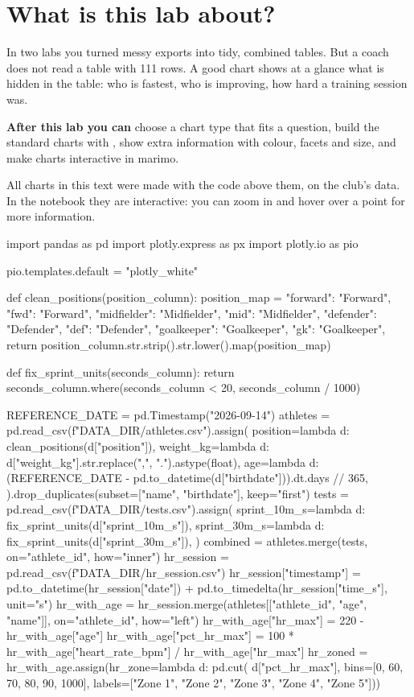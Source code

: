 \documentclass[11pt,a4paper]{article}
\author{dr. Maarten Slembrouck}
\begin{document}

\section*{What is this lab about?}

In two labs you turned messy exports into tidy, combined tables. But a
coach does not read a table with 111 rows. A good chart shows at a
glance what is hidden in the table: who is fastest, who is improving,
how hard a training session was.

\textbf{After this lab you can} choose a chart type that fits a
question, build the standard charts with , show
extra information with colour, facets and size, and make charts
interactive in marimo.

All charts in this text were made with the code above them, on the
club's data. In the notebook they are interactive: you can zoom in and
hover over a point for more information.

\begin{python}[hide]
import pandas as pd
import plotly.express as px
import plotly.io as pio

pio.templates.default = "plotly_white"

def clean_positions(position_column):
    position_map = {
        "forward": "Forward", "fwd": "Forward",
        "midfielder": "Midfielder", "mid": "Midfielder",
        "defender": "Defender", "def": "Defender",
        "goalkeeper": "Goalkeeper", "gk": "Goalkeeper",
    }
    return position_column.str.strip().str.lower().map(position_map)

def fix_sprint_units(seconds_column):
    return seconds_column.where(seconds_column < 20, seconds_column / 1000)

REFERENCE_DATE = pd.Timestamp("2026-09-14")
athletes = pd.read_csv(f"{DATA_DIR}/athletes.csv").assign(
    position=lambda d: clean_positions(d["position"]),
    weight_kg=lambda d: d["weight_kg"].str.replace(",", ".").astype(float),
    age=lambda d: (REFERENCE_DATE - pd.to_datetime(d["birthdate"])).dt.days // 365,
).drop_duplicates(subset=["name", "birthdate"], keep="first")
tests = pd.read_csv(f"{DATA_DIR}/tests.csv").assign(
    sprint_10m_s=lambda d: fix_sprint_units(d["sprint_10m_s"]),
    sprint_30m_s=lambda d: fix_sprint_units(d["sprint_30m_s"]),
)
combined = athletes.merge(tests, on="athlete_id", how="inner")
hr_session = pd.read_csv(f"{DATA_DIR}/hr_session.csv")
hr_session["timestamp"] = pd.to_datetime(hr_session["date"]) + pd.to_timedelta(hr_session["time_s"], unit="s")
hr_with_age = hr_session.merge(athletes[["athlete_id", "age", "name"]], on="athlete_id", how="left")
hr_with_age["hr_max"] = 220 - hr_with_age["age"]
hr_with_age["pct_hr_max"] = 100 * hr_with_age["heart_rate_bpm"] / hr_with_age["hr_max"]
hr_zoned = hr_with_age.assign(hr_zone=lambda d: pd.cut(
    d["pct_hr_max"], bins=[0, 60, 70, 80, 90, 1000],
    labels=["Zone 1", "Zone 2", "Zone 3", "Zone 4", "Zone 5"]))
\end{python}
\end{document}
